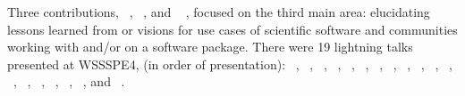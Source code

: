 \documentclass[11pt, oneside]{amsart}
\begin{document}
Three contributions, ~\cite{Ganguly:2016ws}, ~\cite{Shende:2016ws},
and ~\cite{Sallai:2016ws} , focused on the third main area: elucidating lessons learned
from or visions for use cases of scientific software and communities working
with and\slash or on a software package. There were 19 lightning talks presented at WSSSPE4, (in order of
presentation): ~\cite{Sufi:2016ws}, ~\cite{Gesing:2016ws},
~\cite{Ram:2016ws}, ~\cite{Loffler:2016ws}, ~\cite{Katz:2016ws},
~\cite{Idaszak:2016ws}, ~\cite{Hwang:2016ws}, ~\cite{Goble:2016ws},
~\cite{Druskat:2016ws}, ~\cite{Contrastin:2016ws},
~\cite{AAllen:2016ws}, ~\cite{ChueHong:2016wsb},
~\cite{vanHage:2016ws}, ~\cite{GAllen:2016wsb}, ~\cite{Seidel:2016ws}, 
  ~\cite{Emsley:2016ws}, ~\cite{Dongarra:2016ws},
  ~\cite{Bauer:2016ws},  and ~\cite{Aldabjan:2016ws}.


\end{document}
